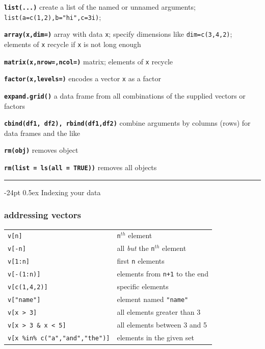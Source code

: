 \documentclass[8pt,landscape]{article}
\makeatletter
\renewcommand\section{\@startsection{section}{1}{0mm}%
                                     {-24pt}%
                                     {0.5ex}%
                                {\color{blue}\normalfont\large\bfseries}}
\newcommand{\code}{\texttt}
\newcommand{\bcode}[1]{\texttt{\textbf{#1}}}
\makeatother
\begin{document}
\begin{multicols*}{3}
\bcode{list(...)} create a list of the named or unnamed arguments;
  \code{list(a=c(1,2),b="hi",c=3i)}; 

\bcode{array(x,dim=)} array with data \code{x}; specify
dimensions like \code{dim=c(3,4,2)}; elements of \code{x} recycle if \code{x}
is not long enough

\bcode{matrix(x,nrow=,ncol=)} matrix; elements of \code{x} recycle

\bcode{factor(x,levels=)} encodes a vector \code{x} as a factor


\bcode{expand.grid()} a data frame from all combinations of the supplied vectors
     or factors

\bcode{cbind(df1, df2), rbind(df1,df2)} combine arguments by columns (rows) for data frames and the like


\bcode{rm(obj)} removes object

\bcode{rm(list = ls(all = TRUE))} removes all objects

\rule{.3\textwidth}{0.4pt}



\section{Indexing your data}

\subsubsection{addressing vectors}

\begin{tabular}{@{}l@{\ }l}
\code{v[n]} & \code{n}$^{th}$ element\\
\code{v[-n]} & all \emph{but} the \code{n}$^{th}$ element\\
\code{v[1:n]} & first \code{n} elements\\
\code{v[-(1:n)]} & elements from \code{n+1} to the end\\
\code{v[c(1,4,2)]} & specific elements\\
\code{v["name"]} & element named \code{"name"}\\
\code{v[x > 3]} & all elements greater than 3\\
\code{v[x > 3 \& x < 5]} & all elements between 3 and 5\\
\code{v[x \%in\% c("a","and","the")]} & elements in the given set\\
\end{tabular}


\end{multicols*}
\end{document}
